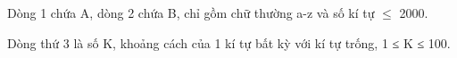 Dòng 1 chứa A, dòng 2 chứa B, chỉ gồm chữ thường a-z và số kí tự  $\le$ 2000.  

   Dòng thứ 3 là số K, khoảng cách của 1 kí tự bất kỳ với kí tự trống, 1 ≤ K ≤ 100.  

\